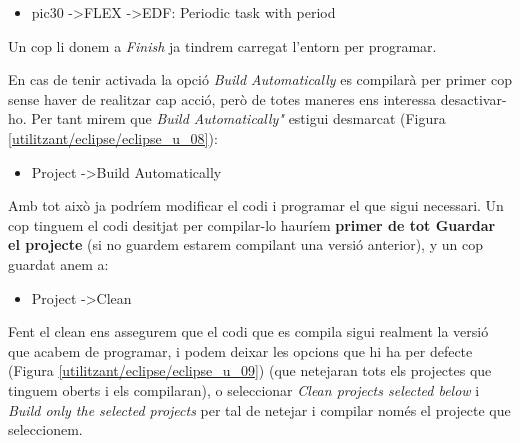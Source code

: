 \begin{itemize}
	\item pic30 -\textgreater FLEX -\textgreater EDF: Periodic task with period
\end{itemize}


Un cop li donem a \emph{Finish} ja tindrem carregat l'entorn per programar. 


En cas de tenir activada la opció \emph{Build Automatically} es compilarà per primer cop sense haver de realitzar cap acció, però de totes maneres ens interessa desactivar-ho. Per tant mirem que \emph{Build Automatically"} estigui desmarcat (Figura \ref{utilitzant/eclipse/eclipse_u_08}):

\begin{itemize}
	\item Project -\textgreater Build Automatically
\end{itemize}


Amb tot això ja podríem modificar el codi i programar el que sigui necessari. Un cop tinguem el codi desitjat per compilar-lo hauríem \textbf{primer de tot Guardar el projecte} (si no guardem estarem compilant una versió anterior), y un cop guardat anem a:

\begin{itemize}
	\item Project -\textgreater Clean
\end{itemize}

Fent el clean ens assegurem que el codi que es compila sigui realment la versió que acabem de programar, i podem deixar les opcions que hi ha per defecte  (Figura \ref{utilitzant/eclipse/eclipse_u_09}) (que netejaran tots els projectes que tinguem oberts i els compilaran), o seleccionar \emph{Clean projects selected below} i \emph{Build only the selected projects} per tal de netejar i compilar només el projecte que seleccionem.


